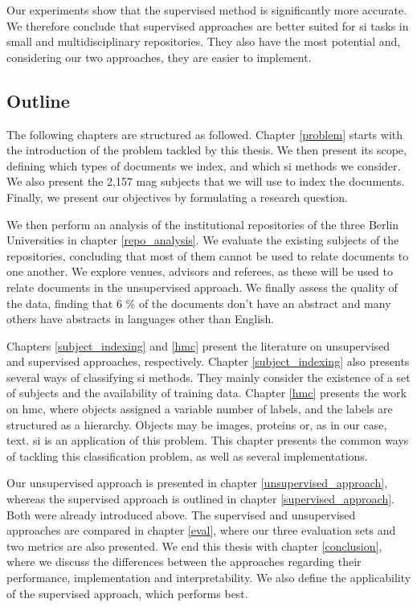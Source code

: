 Our experiments show that the supervised method is significantly more accurate. We therefore conclude that supervised approaches are better suited for \acrshort{si} tasks in small and multidisciplinary repositories. They also have the most potential and, considering our two approaches, they are easier to implement.

\subsection{Outline}

The following chapters are structured as followed. Chapter \ref{problem} starts with the introduction of the problem tackled by this thesis. We then present its scope, defining which types of documents we index, and which \acrshort{si} methods we consider. We also present the 2,157 \acrshort{mag} subjects that we will use to index the documents. Finally, we present our objectives by formulating a research question.

We then perform an analysis of the institutional repositories of the three Berlin Universities in chapter \ref{repo_analysis}. We evaluate the existing subjects of the repositories, concluding that most of them cannot be used to relate documents to one another. We explore venues, advisors and referees, as these will be used to relate documents in the unsupervised approach. We finally assess the quality of the data, finding that 6 \% of the documents don't have an abstract and many others have abstracts in languages other than English.

Chapters \ref{subject_indexing} and \ref{hmc} present the literature on unsupervised and supervised approaches, respectively. Chapter \ref{subject_indexing} also presents several ways of classifying \acrshort{si} methods. They mainly consider the existence of a set of subjects and the availability of training data. Chapter \ref{hmc} presents the work on \acrfull{hmc}, where objects assigned a variable number of labels, and the labels are structured as a hierarchy. Objects may be images, proteins or, as in our case, text. \acrshort{si} is an application of this problem. This chapter presents the common ways of tackling this classification problem, as well as several implementations.

Our unsupervised approach is presented in chapter \ref{unsupervised_approach}, whereas the supervised approach is outlined in chapter \ref{supervised_approach}. Both were already introduced above. The supervised and unsupervised approaches are compared in chapter \ref{eval}, where our three evaluation sets and two metrics are also presented. We end this thesis with chapter \ref{conclusion}, where we discuss the differences between the approaches regarding their performance, implementation and interpretability. We also define the applicability of the supervised approach, which performs best.